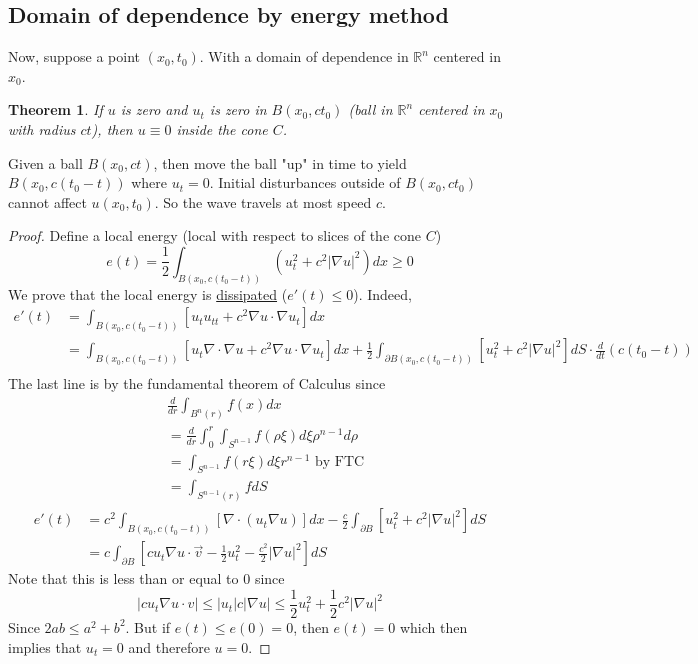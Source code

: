 \documentclass{article}
\newtheorem{theorem}{Theorem}[section]
\newtheorem{one minute paper}[theorem]{One Minute Paper}
\begin{document}
\subsection*{Domain of dependence by energy method}

Now, suppose a point $(x_0, t_0)$. With a domain of dependence in $\mathbb{R}^n$ centered in $x_0$. 

\begin{theorem}
    If $u$ is zero and $u_t$ is zero in $B(x_0, ct_0)$ (ball in $\mathbb{R}^n$ centered in $x_0$ with radius $ct$), then $u \equiv 0$ inside 
    the cone $C$. 
\end{theorem}

Given a ball $B(x_0, ct)$, then move the ball "up" in time to yield $B(x_0, c(t_0-t))$ where $u_t = 0$. Initial disturbances outside of $B(x_0,ct_0)$ cannot affect $u(x_0,t_0)$. So the wave travels at 
most speed $c$.

\begin{proof}
    Define a local energy (local with respect to slices of the cone $C$)
    \begin{equation}
        e(t) = \frac{1}{2}\int_{B(x_0, c(t_0 - t))}\left( u_t^2 + c^2 |\nabla u|^2 \right)dx \geq 0
    \end{equation}
    We prove that the local energy is \underline{dissipated} ($e'(t) \leq 0$). Indeed,
    \begin{align*}
        e'(t) &= \int_{B(x_0, c(t_0 - t))}\left[ u_t u_{tt} + c^2 \nabla u \cdot \nabla u_t \right]dx \\
        &=\int_{B(x_0, c(t_0 - t))}\left[ u_t \nabla \cdot \nabla u + c^2 \nabla u \cdot \nabla u_t \right]dx  + \frac{1}{2}\int_{\partial B(x_0, c(t_0 - t))}\left[ u_t^2 + c^2 |\nabla u|^2 \right]dS \cdot \frac{d}{dt}(c(t_0 -t))\\
    \end{align*}
    The last line is by the fundamental theorem of Calculus since 
    \begin{align*}
        &\frac{d}{dr}\int_{B^n(r)}f(x)dx \\
        &= \frac{d}{dr}\int_0^r \int_{S^{n-1}}f(\rho \xi)d\xi \rho^{n-1}d\rho \\
        &= \int_{S^{n-1}}f(r\xi)d\xi r^{n-1} \text{ by FTC} \\
        &= \int_{S^{n-1}(r)}fdS
    \end{align*}
    \begin{align*}
        e'(t) &= c^2 \int_{B(x_0, c(t_0 - t))}\left[ \nabla \cdot (u_t \nabla u) \right]dx - \frac{c}{2}\int_{\partial B}\left[ u_t^2 + c^2 |\nabla u|^2 \right]dS\\
        &= c\int_{\partial B}\left[ cu_t \nabla u \cdot \vec{v} - \frac{1}{2}u_t^2 - \frac{c^2}{2}|\nabla u|^2 \right]dS
    \end{align*}
    Note that this is less than or equal to $0$ since 
    \begin{equation}
        |cu_t\nabla u \cdot v| \leq |u_t| c|\nabla u| \leq \frac{1}{2}u_t^2 + \frac{1}{2}c^2 |\nabla u|^2 
    \end{equation}
    Since $2ab \leq a^2 + b^2$. But if $e(t) \leq e(0) = 0$, then $e(t) = 0$ which then implies that $u_t = 0$ and therefore $u = 0$. 
\end{proof}
\end{document}

